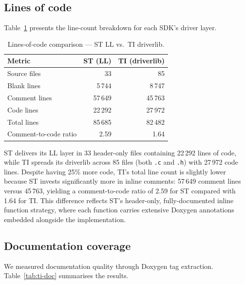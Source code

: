 \subsection{Lines of code}
\label{subsec:ti-loc}

Table~\ref{tab:ti-loc} presents the line-count breakdown for each SDK's driver layer.

\begin{table}[H]
\centering
\caption{Lines-of-code comparison --- ST LL vs.\ TI driverlib.}
\label{tab:ti-loc}
\begin{tabular}{l r r}
\toprule
\textbf{Metric} & \textbf{ST (LL)} & \textbf{TI (driverlib)} \\
\midrule
Source files      &        33 &        85 \\
Blank lines       &     5\,744 &     8\,747 \\
Comment lines     &    57\,649 &    45\,763 \\
Code lines        &    22\,292 &    27\,972 \\
\midrule
Total lines       &    85\,685 &    82\,482 \\
Comment-to-code ratio & 2.59 & 1.64 \\
\bottomrule
\end{tabular}
\end{table}

ST delivers its LL layer in 33 header-only files containing 22\,292 lines of code, while
TI spreads its driverlib across 85 files (both \texttt{.c} and \texttt{.h}) with
27\,972 code lines. Despite having 25\% more code, TI's total line count is slightly
lower because ST invests significantly more in inline comments: 57\,649 comment lines
versus 45\,763, yielding a comment-to-code ratio of 2.59 for ST compared with 1.64 for TI.
This difference reflects ST's header-only, fully-documented inline function strategy, where
each function carries extensive Doxygen annotations embedded alongside the implementation.

\subsection{Documentation coverage}
\label{subsec:ti-doc}

We measured documentation quality through Doxygen tag extraction.
Table~\ref{tab:ti-doc} summarises the results.

